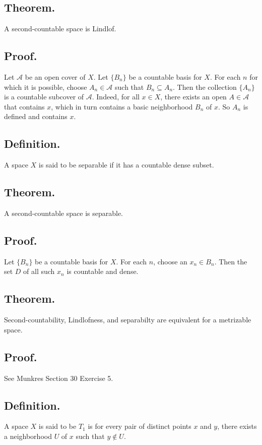 \documentclass[titlepage]{article}
\begin{document}
\subsection{Theorem.} A second-countable space is Lindlof.

\subsection{Proof.} Let $\mathcal{A}$ be an open cover of $X$. Let $\{B_{n}\}$ be a countable basis for $X$. For each $n$ for which it is possible, choose $A_{n} \in \mathcal{A}$ such that $B_{n} \subseteq A_{n}$. Then the collection $\{A_{n}\}$ is a countable subcover of $\mathcal{A}$. Indeed, for all $x \in X$, there exists an open $A \in \mathcal{A}$ that contains $x$, which in turn contains a basic neighborhood $B_{n}$ of $x$. So $A_{n}$ is defined and contains $x$.

\subsection{Definition.} A space $X$ is said to be separable if it has a countable dense subset.

\subsection{Theorem.} A second-countable space is separable.

\subsection{Proof.}

Let $\{B_{n}\}$ be a countable basis for $X$. For each $n$, choose an $x_{n} \in B_{n}$. Then the set $D$ of all such $x_{n}$ is countable and dense.

\subsection{Theorem.} Second-countability, Lindlofness, and separabilty are equivalent for a metrizable space.

\subsection{Proof.} See Munkres Section 30 Exercise 5.

\subsection{Definition.} A space $X$ is said to be $T_{1}$ is for every pair of distinct points $x$ and $y$, there exists a neighborhood $U$ of $x$ such that $y \notin U$.
\end{document}
